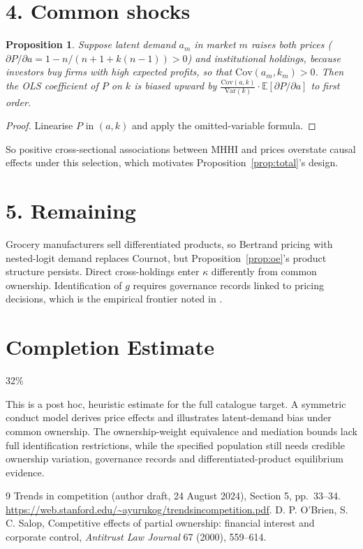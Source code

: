 \documentclass[11pt]{article}
\newtheorem{proposition}[theorem]{Proposition}
\theoremstyle{definition}
\begin{document}
\section*{4. Common shocks}
\begin{proposition}\label{prop:bias}
Suppose latent demand $a_m$ in market $m$ raises both prices ($\partial P/\partial a=1-n/(n+1+k(n-1))>0$) and institutional
holdings, because investors buy firms with high expected profits, so that $\mathrm{Cov}(a_m,k_m)>0$. Then the OLS
coefficient of $P$ on $k$ is biased upward by
$\frac{\mathrm{Cov}(a,k)}{\mathrm{Var}(k)}\cdot\mathbb E[\partial P/\partial a]$ to first order.
\end{proposition}
\begin{proof}
Linearise $P$ in $(a,k)$ and apply the omitted-variable formula.
\end{proof}
So positive cross-sectional associations between MHHI and prices overstate causal effects under this selection, which
motivates Proposition~\ref{prop:total}'s design.

\section*{5. Remaining}
Grocery manufacturers sell differentiated products, so Bertrand pricing with nested-logit demand replaces Cournot, but
Proposition~\ref{prop:oe}'s product structure persists. Direct cross-holdings enter $\kappa$ differently from common
ownership. Identification of $g$ requires governance records linked to pricing decisions, which is the empirical frontier
noted in \cite{yur}.

\section{Completion Estimate}
32\%

This is a post hoc, heuristic estimate for the full catalogue target.
A symmetric conduct model derives price effects and illustrates latent-demand bias under common ownership. The ownership-weight equivalence and mediation bounds lack full identification restrictions, while the specified population still needs credible ownership variation, governance records and differentiated-product equilibrium evidence.

\begin{thebibliography}{9}
 Trends in competition (author draft, 24 August 2024), Section 5, pp.~33--34. \url{https://web.stanford.edu/~ayurukog/trendsincompetition.pdf}.
 D. P. O'Brien, S. C. Salop, Competitive effects of partial ownership: financial interest and corporate control, \emph{Antitrust Law Journal} 67 (2000), 559--614.
\end{thebibliography}
\end{document}
